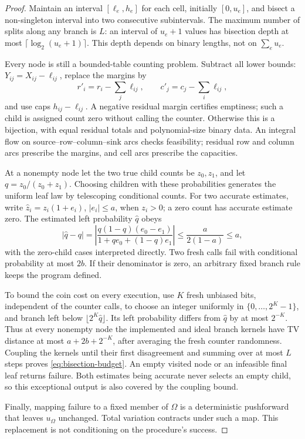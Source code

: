 \documentclass[11pt]{article}
\begin{document}
\begin{proof}
Maintain an interval \([\ell_e,h_e]\) for each cell, initially \([0,u_e]\), and bisect a non-singleton interval into two consecutive subintervals. The maximum number of splits along any branch is \(L\): an interval of \(u_e+1\) values has bisection depth at most \(\lceil\log_2(u_e+1)\rceil\). This depth depends on binary lengths, not on \(\sum_e u_e\).

Every node is still a bounded-table counting problem. Subtract all lower bounds:
\(Y_{ij}=X_{ij}-\ell_{ij}\), replace the margins by
\[
 r'_i=r_i-\sum_j\ell_{ij},
 \qquad c'_j=c_j-\sum_i\ell_{ij},
\]
and use caps \(h_{ij}-\ell_{ij}\). A negative residual margin certifies emptiness; such a child is assigned count zero without calling the counter. Otherwise this is a bijection, with equal residual totals and polynomial-size binary data. An integral flow on source--row--column--sink arcs checks feasibility; residual row and column arcs prescribe the margins, and cell arcs prescribe the capacities.

At a nonempty node let the two true child counts be \(z_0,z_1\), and let \(q=z_0/(z_0+z_1)\). Choosing children with these probabilities generates the uniform leaf law by telescoping conditional counts. For two accurate estimates, write \(\widehat z_i=z_i(1+e_i)\), \(|e_i|\leq a\), when \(z_i>0\); a zero count has accurate estimate zero. The estimated left probability \(\widehat q\) obeys
\[
 |\widehat q-q|
 =\left|\frac{q(1-q)(e_0-e_1)}
 {1+qe_0+(1-q)e_1}\right|
 \leq\frac{a}{2(1-a)}\leq a,
\]
with the zero-child cases interpreted directly. Two fresh calls fail with conditional probability at most \(2b\). If their denominator is zero, an arbitrary fixed branch rule keeps the program defined.

To bound the coin cost on every execution, use \(K\) fresh unbiased bits, independent of the counter calls, to choose an integer uniformly in \(\{0,\ldots,2^K-1\}\), and branch left below \(\lfloor2^K\widehat q\rfloor\). Its left probability differs from \(\widehat q\) by at most \(2^{-K}\). Thus at every nonempty node the implemented and ideal branch kernels have TV distance at most \(a+2b+2^{-K}\), after averaging the fresh counter randomness. Coupling the kernels until their first disagreement and summing over at most \(L\) steps proves \eqref{eq:bisection-budget}. An empty visited node or an infeasible final leaf returns failure. Both estimates being accurate never selects an empty child, so this exceptional output is also covered by the coupling bound.

Finally, mapping failure to a fixed member of \(\Omega\) is a deterministic pushforward that leaves \(u_\Omega\) unchanged. Total variation contracts under such a map. This replacement is not conditioning on the procedure's success.
\end{proof}
\end{document}
